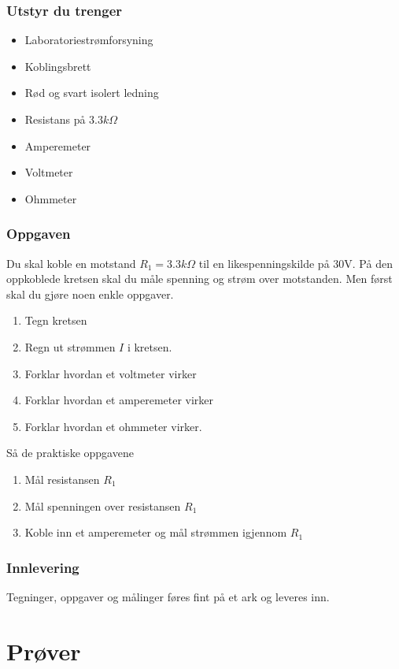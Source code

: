 \documentclass[12pt,a4paper]{article}
\begin{document}
\subsubsection*{Utstyr du trenger}
\begin{itemize}
\item Laboratoriestrømforsyning
\item Koblingsbrett
\item Rød og svart isolert ledning
\item Resistans på $3.3k\Omega$ 
\item Amperemeter
\item Voltmeter
\item Ohmmeter
\end{itemize}

\subsubsection*{Oppgaven}

Du skal koble en motstand $R_{1}=3.3k\Omega$ til en likespenningskilde
på 30V. På den oppkoblede kretsen skal du måle spenning og strøm over
motstanden. Men først skal du gjøre noen enkle oppgaver. 
\begin{enumerate}
\item Tegn kretsen
\item Regn ut strømmen $I$ i kretsen. 
\item Forklar hvordan et voltmeter virker
\item Forklar hvordan et amperemeter virker
\item Forklar hvordan et ohmmeter virker. 
\end{enumerate}
Så de praktiske oppgavene
\begin{enumerate}
\item Mål resistansen $R_{1}$
\item Mål spenningen over resistansen $R_{1}$
\item Koble inn et amperemeter og mål strømmen igjennom $R_{1}$ 
\end{enumerate}

\subsubsection*{Innlevering}

Tegninger, oppgaver og målinger føres fint på et ark og leveres inn. 

\section{Prøver}
\end{document}
